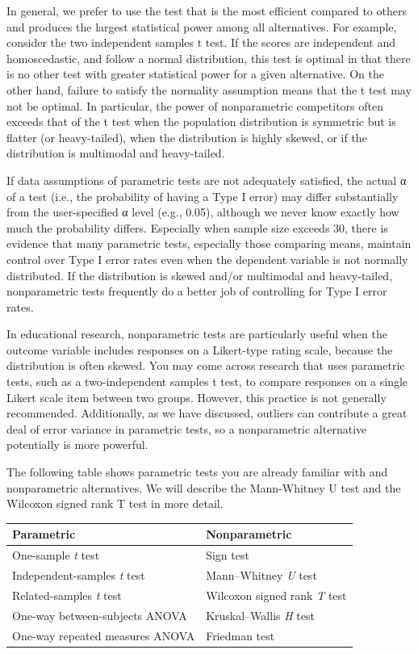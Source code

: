 \documentclass[
  letterpaper,
  DIV=11,
  numbers=noendperiod]{scrreprt}
\begin{document}
In general, we prefer to use the test that is the most efficient
compared to others and produces the largest statistical power among all
alternatives. For example, consider the two independent samples t test.
If the scores are independent and homoscedastic, and follow a normal
distribution, this test is optimal in that there is no other test with
greater statistical power for a given alternative. On the other hand,
failure to satisfy the normality assumption means that the t test may
not be optimal. In particular, the power of nonparametric competitors
often exceeds that of the t test when the population distribution is
symmetric but is flatter (or heavy-tailed), when the distribution is
highly skewed, or if the distribution is multimodal and heavy-tailed.

If data assumptions of parametric tests are not adequately satisfied,
the actual α of a test (i.e., the probability of having a Type I error)
may differ substantially from the user-specified α level (e.g., 0.05),
although we never know exactly how much the probability differs.
Especially when sample size exceeds 30, there is evidence that many
parametric tests, especially those comparing means, maintain control
over Type I error rates even when the dependent variable is not normally
distributed. If the distribution is skewed and/or multimodal and
heavy-tailed, nonparametric tests frequently do a better job of
controlling for Type I error rates.

In educational research, nonparametric tests are particularly useful
when the outcome variable includes responses on a Likert-type rating
scale, because the distribution is often skewed. You may come across
research that uses parametric tests, such as a two-independent samples t
test, to compare responses on a single Likert scale item between two
groups. However, this practice is not generally recommended.
Additionally, as we have discussed, outliers can contribute a great deal
of error variance in parametric tests, so a nonparametric alternative
potentially is more powerful.

The following table shows parametric tests you are already familiar with
and nonparametric alternatives. We will describe the Mann-Whitney U test
and the Wilcoxon signed rank T test in more detail.

\begin{longtable}[]{@{}ll@{}}
\toprule\noalign{}
\textbf{Parametric} & \textbf{Nonparametric} \\
\midrule\noalign{}
\endhead
\bottomrule\noalign{}
\endlastfoot
One-sample \emph{t} test & Sign test \\
Independent-samples \emph{t} test & Mann--Whitney \emph{U} test \\
Related-samples \emph{t} test & Wilcoxon signed rank \emph{T} test \\
One-way between-subjects ANOVA & Kruskal--Wallis \emph{H} test \\
One-way repeated measures ANOVA & Friedman test \\
\end{longtable}
\end{document}
